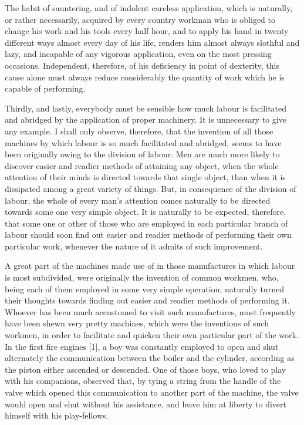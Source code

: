 The habit of sauntering, and of indolent careless application, which is naturally, or rather necessarily, acquired by every country workman who is obliged to change his work and his tools every half hour, and to apply his hand in twenty different ways almost every day of his life, renders him almost always slothful and lazy, and incapable of any vigorous application, even on the most pressing occasions. Independent, therefore, of his deficiency in point of dexterity, this cause alone must always reduce considerably the quantity of work which he is capable of performing.\par

Thirdly, and lastly, everybody must be sensible how much labour is facilitated and abridged by the application of proper machinery. It is unnecessary to give any example. I shall only observe, therefore, that the invention of all those machines by which labour is so much facilitated and abridged, seems to have been originally owing to the division of labour. Men are much more likely to discover easier and readier methods of attaining any object, when the whole attention of their minds is directed towards that single object, than when it is dissipated among a great variety of things. But, in consequence of the division of labour, the whole of every man’s attention comes naturally to be directed towards some one very simple object. It is naturally to be expected, therefore, that some one or other of those who are employed in each particular branch of labour should soon find out easier and readier methods of performing their own particular work, whenever the nature of it admits of such improvement.\par

A great part of the machines made use of in those manufactures in which labour is most subdivided, were originally the invention of common workmen, who, being each of them employed in some very simple operation, naturally turned their thoughts towards finding out easier and readier methods of performing it. Whoever has been much accustomed to visit such manufactures, must frequently have been shewn very pretty machines, which were the inventions of such workmen, in order to facilitate and quicken their own particular part of the work. In the first fire engines [1], a boy was constantly employed to open and shut alternately the communication between the boiler and the cylinder, according as the piston either ascended or descended. One of those boys, who loved to play with his companions, observed that, by tying a string from the handle of the valve which opened this communication to another part of the machine, the valve would open and shut without his assistance, and leave him at liberty to divert himself with his play-fellows.\par

